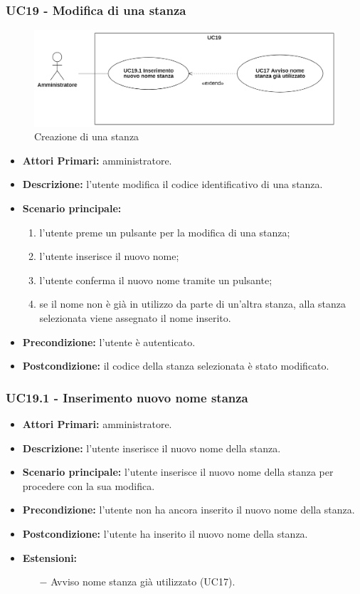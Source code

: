 \subsubsection{UC19 - Modifica di una stanza}
\begin{figure}[H]
	\centering
	\includegraphics[width=18cm]{res/images/UC19Nuovo.png}
	\caption{Creazione di una stanza}
\end{figure}
\begin{itemize}
	\item\textbf{Attori Primari:}
	amministratore.
	\item\textbf{Descrizione:}
	l'utente modifica il codice identificativo di una stanza.
	\item\textbf{Scenario principale:} 
	\begin{enumerate}
		\item l'utente preme un pulsante per la modifica di una stanza;
		\item l'utente inserisce il nuovo nome;
		\item l'utente conferma il nuovo nome tramite un pulsante;
		\item se il nome non è già in utilizzo da parte di un'altra stanza, alla stanza selezionata viene assegnato il nome inserito.
	\end{enumerate}
	\item\textbf{Precondizione:} 
	l'utente è autenticato.
	\item\textbf{Postcondizione:}
	il codice della stanza selezionata è stato modificato.
\end{itemize}
\subsubsection{UC19.1 - Inserimento nuovo nome stanza}
\begin{itemize}
	\item\textbf{Attori Primari:}
	amministratore.
	\item\textbf{Descrizione:}
	l'utente inserisce il nuovo nome della stanza.
	\item\textbf{Scenario principale:} 
	l'utente inserisce il nuovo nome della stanza per procedere con la sua modifica.
	\item\textbf{Precondizione:} 
	l'utente non ha ancora inserito il nuovo nome della stanza.
	\item\textbf{Postcondizione:}
	l'utente ha inserito il nuovo nome della stanza.
	\item\textbf{Estensioni:}
	\begin{itemize}
		\item[$-$] Avviso nome stanza già utilizzato (UC17).
	\end{itemize}
\end{itemize}


